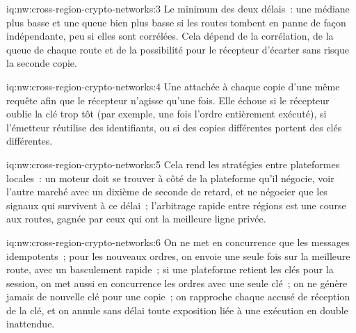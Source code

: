 \begin{solution}{iq:nw:cross-region-crypto-networks:3}
Le minimum des deux délais~: une médiane plus basse et une queue bien plus basse si les routes tombent en panne de façon indépendante, peu si elles sont corrélées. Cela dépend de la
corrélation, de la queue de chaque route et de la possibilité pour le récepteur d'écarter sans risque la seconde copie.
\end{solution}

\begin{solution}{iq:nw:cross-region-crypto-networks:4}
Une  attachée à chaque copie d'une même requête afin que le récepteur n'agisse qu'une fois. Elle échoue si le récepteur oublie la clé trop tôt (par
exemple, une fois l'ordre entièrement exécuté), si l'émetteur réutilise des identifiants, ou si des copies différentes portent des clés différentes.
\end{solution}

\begin{solution}{iq:nw:cross-region-crypto-networks:5}
Cela rend les stratégies entre plateformes locales~: un moteur doit se trouver à côté de la plateforme qu'il négocie, voir l'autre marché avec un dixième de seconde de retard, et ne négocier que
les signaux qui survivent à ce délai~; l'arbitrage rapide entre régions est une course aux routes, gagnée par ceux qui ont la meilleure ligne privée.
\end{solution}

\begin{solution}{iq:nw:cross-region-crypto-networks:6}
On ne met en concurrence que les messages idempotents~; pour les nouveaux ordres, on envoie une seule fois sur la meilleure route, avec un basculement rapide~; si une plateforme retient les clés pour la session, on met aussi en concurrence les
ordres avec une seule clé~; on ne génère jamais de nouvelle clé pour une copie~; on rapproche chaque accusé de réception de la clé, et on annule sans délai toute
exposition liée à une exécution en double inattendue.
\end{solution}
